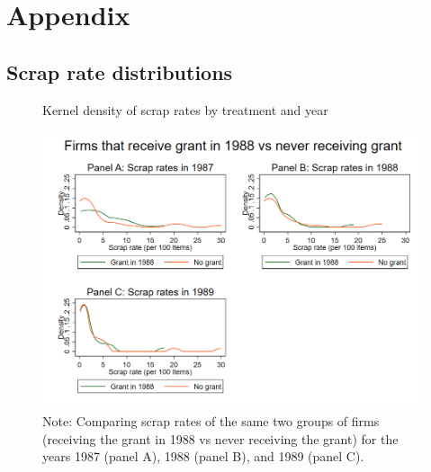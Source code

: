 \section{Appendix}
\label{s:appendix}

\subsection{Scrap rate distributions}
\label{s:appendix_scrap}

\begin{figure}
    \centering
    \caption{Kernel density of scrap rates by treatment and year}
    \label{f:kernels}
    \includegraphics[width=1.0 \textwidth]{figures/kernels_combined}
    \caption*{Note: Comparing scrap rates of the same two groups of firms (receiving the grant in 1988 vs never receiving the grant) for the years 1987 (panel A), 1988 (panel B), and 1989 (panel C).}
\end{figure}
